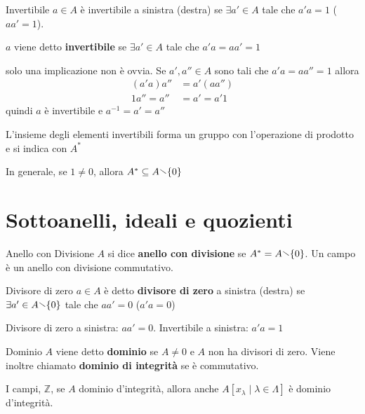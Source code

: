 \begin{definition}{Invertibile}
    \(a \in A\) è invertibile a sinistra (destra) se \(\exists a' \in A\) tale
    che \(a' a = 1\) (\(a a' = 1\)).

    \(a\) viene detto \textbf{invertibile} se \(\exists a' \in A\) tale che \(a' a = aa' = 1\)
\end{definition}
\begin{remark}
    solo una implicazione non è ovvia. Se \(a', a'' \in A\) sono tali che \(a' a
    = a a'' = 1\) allora
    \begin{align*}
        {(a' a)}a'' &= a' (a a'') \\
        1 a'' = a'' &= a' = a' 1
    \end{align*}
    quindi \(a\) è invertibile e \(a^{-1} = a' = a''\) 
\end{remark}


\begin{remark}
    L'insieme degli elementi invertibili forma un gruppo con l'operazione di
    prodotto e si indica con \(A^{*}\) 
\end{remark}

In generale, se \(1 \neq 0\), allora \(A^{*} \subseteq A \sminus \{0\}  \) 

\section{Sottoanelli, ideali e quozienti}

\begin{definition}{Anello con Divisione}
    \(A\) si dice \textbf{anello con divisione} se \(A^{*} = A \sminus \{0\} \).
    Un campo è un anello con divisione commutativo.
\end{definition}

\begin{definition}{Divisore di zero}
    \(a \in A\) è detto \textbf{divisore di zero} a sinistra (destra) se \(\exists  a' \in A \sminus \{0\} \) tale che \(a a' = 0\) (\(a' a = 0\))
\end{definition}
\begin{remark}{}
    Divisore di zero a sinistra: \(aa' = 0\). Invertibile a sinistra: \(a' a = 1\) 
\end{remark}


\begin{definition}{Dominio}
    \(A\) viene detto \textbf{dominio} se \(A \neq 0\) e \(A\) non ha divisori
    di zero. Viene inoltre chiamato \textbf{dominio di integrità} se è
    commutativo.
\end{definition}
\begin{example}
    I campi, \(\mathbb{Z}\), se \(A\) dominio d'integrità, allora anche \(A[x_{\lambda} \mid \lambda \in \Lambda ]\) è dominio d'integrità.
\end{example}

